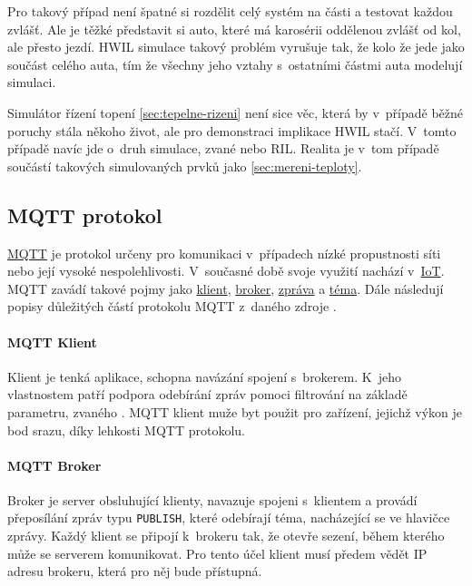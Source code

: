 Pro takový případ není špatné si rozdělit celý systém na části a testovat každou zvlášť. Ale je těžké představit si auto, které má karosérii oddělenou zvlášť od kol, ale přesto jezdí. HWIL simulace takový problém vyrušuje tak, že kolo  že jede jako součást celého auta, tím že všechny jeho vztahy s~ostatními částmi auta modelují simulaci.

Simulátor řízení topení \ref{sec:tepelne-rizeni} není sice věc, která by v~případě běžné poruchy stála někoho život, ale pro demonstraci implikace HWIL stačí. V~tomto případě navíc jde o~druh simulace, zvané  nebo RIL. Realita je v~tom případě součástí takových simulovaných prvků jako \ref{sec:mereni-teploty}.

\subsection{MQTT protokol}
\label{subsec:mqtt-proto}

\href{http://mqtt.org/}{MQTT} je protokol určeny pro komunikaci v~případech nízké propustnosti síti nebo její vysoké nespolehlivosti. V~současné době svoje využití nachází v~\href{https://en.wikipedia.org/wiki/Internet_of_things}{IoT}. MQTT zavádí takové pojmy jako \hyperref[par:client]{klient}, \hyperref[par:broker]{broker}, \hyperref[par:message]{zpráva} a \hyperref[par:topic]{téma}. Dále následují popisy důležitých částí protokolu MQTT z~daného zdroje \cite{mqtt}.

\paragraph{MQTT Klient}
\label{par:client}

Klient je tenká aplikace, schopna navázání spojení s~brokerem. K~jeho vlastnostem patří podpora odebírání zpráv pomoci filtrování na základě parametru, zvaného \hyperref[par:topic]{}. MQTT klient muže byt použit pro zařízení, jejichž výkon je bod srazu, díky lehkosti MQTT protokolu.

\paragraph{MQTT Broker}
\label{par:broker}

Broker je server obsluhující klienty, navazuje spojeni s~klientem a provádí přeposílání zpráv typu \texttt{PUBLISH}, které odebírají téma, nacházející se ve hlavičce zprávy. Každý klient se připojí k~brokeru tak, že otevře sezení, během kterého může se serverem komunikovat. Pro tento účel klient musí předem vědět IP adresu brokeru, která pro něj bude přístupná.

